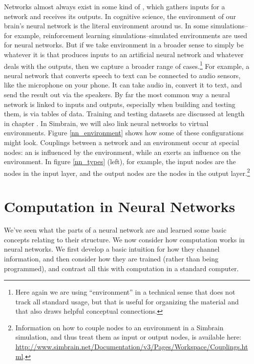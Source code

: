 Networks almost always exist in some kind of  , which gathers inputs for a network and receives its outputs. In cognitive science, the environment of our brain's neural network is the literal environment around us. In some simulations--for example, reinforcement learning simulations--simulated environments are used for neural networks. But if we take environment in a broader sense to simply be whatever it is that produces inputs to an artificial neural network and whatever deals with the outputs, then we capture a broader range of cases.\footnote{Here again we are using ``environment'' in a technical sense that does not track all standard usage, but that is useful for organizing the material and that also draws helpful conceptual connections.}  For example, a neural network that converts speech to text can be connected to audio sensors, like the microphone on your phone. It can take audio in, convert it to text, and send the result out via the speakers. By far the most common way a neural network is linked to inputs and outputs, especially when building and testing them, is via tables of data. Training and testing datasets are discussed at length in chapter . In Simbrain, we will also link neural networks to virtual environments. Figure \ref{nn_environment} shows how some of these configurations might look. Couplings between a network and an environment occur at special nodes:  an   is influenced by the environment, while an   exerts an influence on the environment. In figure \ref{nn_types} (left), for example, the input nodes are the nodes in the input layer, and the output nodes are the nodes in the output layer.\footnote{Information on how to couple nodes to an environment in a Simbrain simulation, and thus treat them as input or output nodes, is available here: \url{http://www.simbrain.net/Documentation/v3/Pages/Workspace/Couplings.html}.} 

\section{Computation in Neural Networks}\label{intro_comp_nn}

We've seen what the parts of a neural network are and learned some basic concepts relating to their structure. We now consider  how computation works in neural networks. We first develop a basic intuition for how they channel information, and then consider how they are trained (rather than being programmed), and contrast all this with computation in a standard computer.

